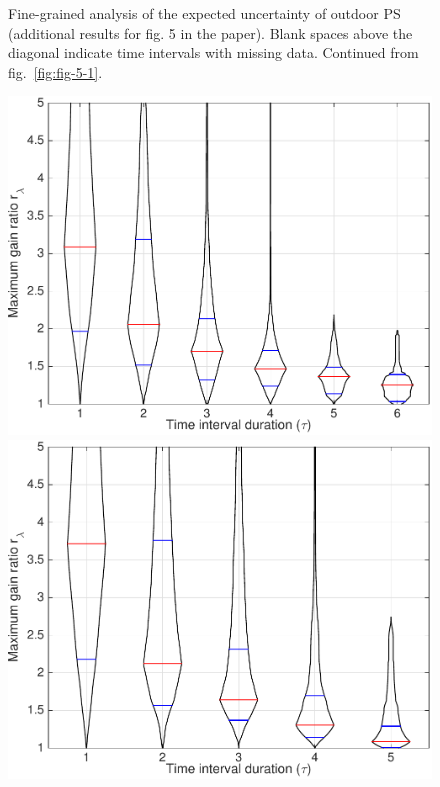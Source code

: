 \begin{figure}
\begin{minipage}[c]{\mylength}
\end{minipage}
\vspace{1em}
\caption{Fine-grained analysis of the expected uncertainty of outdoor PS (additional results for fig. 5 in the paper). Blank spaces above the diagonal indicate time intervals with missing data. Continued from fig.~\ref{fig:fig-5-1}.}
\label{fig:fig-5-2}
\end{figure}

\begin{figure}
\centering
\includegraphics[width=\mylength]{dist/20130711-maxGain-local-relativePerf}
\includegraphics[width=\mylength]{dist/20130816-maxGain-local-relativePerf}

\end{figure}
